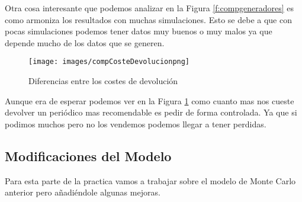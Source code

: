 \documentclass[12pt,a4paper]{article}
\begin{document}
Otra cosa interesante que podemos analizar en la Figura \ref{f:compgeneradores} es como armoniza los resultados con muchas simulaciones. Esto se debe a que con pocas simulaciones podemos tener datos muy  buenos o muy malos ya que depende mucho de los datos que se generen. 
\begin{figure}[H]
	\centering
	\texttt{[image: images/compCosteDevolucionpng]}
	\caption{Diferencias entre los costes de devolución}
	\label{fig:compcostedevolucionpng}
\end{figure}
Aunque era de esperar podemos ver en la Figura \ref{fig:compcostedevolucionpng} como cuanto mas nos cueste devolver un periódico mas recomendable es pedir de forma controlada. Ya que si podimos muchos pero no los vendemos podemos llegar a tener perdidas. 
\subsection{Modificaciones del Modelo}
Para esta parte de la practica vamos a trabajar sobre el modelo de Monte Carlo anterior pero añadiéndole algunas mejoras. 
\end{document}
